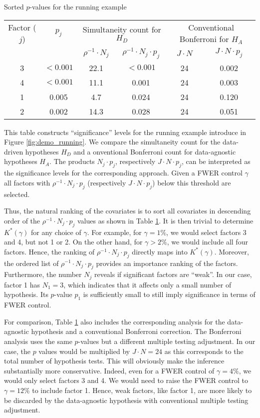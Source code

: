 \documentclass[11pt]{article}
\newcommand\tcaptab[1]{\captionsetup{position=top, font=normalsize, labelfont=bf, textfont=normalfont, justification=centering, margin=0mm, aboveskip=1mm, belowskip=0mm, labelsep=colon, singlelinecheck=false}\caption{#1}}
\newcommand\bnotetab[1]{\captionsetup{position=bottom, font=footnotesize,  textfont=normalfont, margin=1mm, skip=2mm, justification=justified, singlelinecheck=false}\caption*{#1}}
\begin{document}
	\begin{table}[t!]
		\tcaptab{Sorted $p$-values for the running example}\label{tab:toy}
		\centering
		\begin{tabular}{cc|cc|cc}
			\toprule		Factor ($j$) & $p_j$ &\multicolumn{2}{c|}{Simultaneity count for $H_D$} & \multicolumn{2}{c}{Conventional Bonferroni for $H_A$}\\ 
			&    & $\rho^{-1} \cdot N_j$    &$\rho^{-1} \cdot N_j \cdot p_j$ & $J\cdot N$&$J\cdot N\cdot p_j$\\ \midrule
			3 &$<0.001$ & 22.1&$<0.001$&24& 0.002\\
			4   &$<0.001$& 11.1& 0.001&24 & 0.003\\
			1   & 0.005 & 4.7& 0.024&24&0.120 \\
			2   & 0.002& 14.3 & 0.028&24&0.051\\ \bottomrule
		\end{tabular}
		\bnotetab{This table constructs ``significance'' levels for the running example introduce in Figure \ref{fig:demo_running}. We compare the simultaneity count for the data-driven hypotheses $H_D$ and a onventional Bonferroni count for data-agnostic hypotheses $H_A$. The products $N_j \cdot p_j$, respectively $J\cdot N\cdot p_j$, can be interpreted as the significance levels for the corresponding approach. Given a FWER control $\gamma$ all factors with $\rho^{-1}\cdot N_j \cdot p_j$ (respectively $J\cdot N\cdot p_j$) below this threshold are selected.}
	\end{table}
	
	Thus, the natural ranking of the covariates is to sort all covariates in descending order of the $\rho ^{-1}\cdot N_j\cdot p_j $ values as shown in Table \ref{tab:toy}. It is then trivial to determine $K^*(\gamma)$ for any choice of $\gamma$. For example, for $\gamma=1\%$, we would select factors 3 and 4, but not 1 or 2. On the other hand, for $\gamma>2\%$, we would include all four factors. Hence, the ranking of $\rho ^{-1}\cdot N_j\cdot p_j $ directly maps into $K^*(\gamma)$. Moreover, the ordered list of $\rho ^{-1}\cdot N_j\cdot p_j $ provides an importance ranking of the factors. Furthermore, the number $N_j$ reveals if significant factors are ``weak''. In our case, factor 1 has $N_1=3$, which indicates that it affects only a small number of hypothesis. Its $p$-value $p_1$ is sufficiently small to still imply significance in terms of FWER control.
	
	For comparison, Table \ref{tab:toy} also includes the corresponding analysis for the data-agnostic hypothesis and a conventional Bonferroni correction. The Bonferroni analysis uses the same $p$-values but a different multiple testing adjustment. In our case, the $p$ values would be multiplied by $J \cdot N=24$ as this corresponds to the total number of hypothesis tests. This will obviously make the inference substantially more conservative. Indeed, even for a FWER control of $\gamma=4\%$, we would only select factors 3 and 4. We would need to raise the FWER control to $\gamma=12\%$ to include factor 1. Hence, weak factors, like factor 1, are more likely to be discarded by the data-agnostic hypothesis with conventional multiple testing adjustment. 
	
\end{document}
